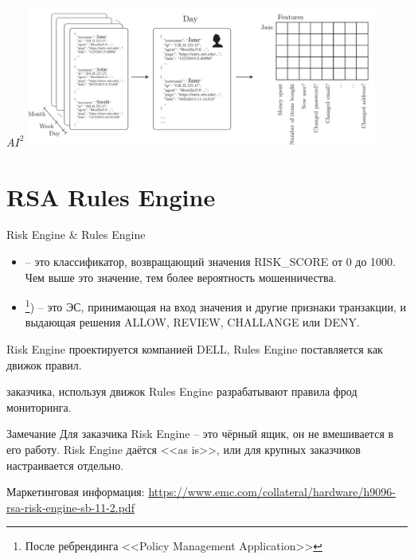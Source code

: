 \begin{frame}{$AI^2$}
	\includegraphics[width=11.5cm]{../pic/ai2_second.png}
\end{frame}

\section{RSA Rules Engine}\label{section:rules_engine}

\begin{frame}{Risk Engine \& Rules Engine}
	\begin{itemize}
		\item {} -- это классификатор, 
		возвращающий значения RISK\_SCORE от 0 до 1000. 
		Чем выше это значение, тем более вероятность мошенничества.
		\item {}\footnote{После ребрендинга <<Policy Management Application>>}) -- это ЭС,
		принимающая на вход значения 
		и другие признаки транзакции, и выдающая решения
		ALLOW, REVIEW, CHALLANGE или DENY.
	\end{itemize}
	
	Risk Engine проектируется компанией DELL, 
	Rules Engine поставляется как движок правил. 
	
	 заказчика, используя движок Rules Engine разрабатывают 
	правила фрод мониторинга.
\end{frame}

\begin{frame}
	\begin{block}{Замечание}
		Для заказчика Risk Engine -- это чёрный ящик,
		он не вмешивается в его работу. 
		Risk Engine даётся <<as is>>, 
		или для крупных заказчиков настраивается отдельно.
	\end{block}
	\small
	Маркетинговая информация: \url{https://www.emc.com/collateral/hardware/h9096-rsa-risk-engine-sb-11-2.pdf}
\end{frame}

\begin{frame}
	
\end{frame}


